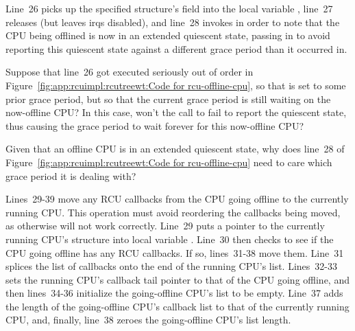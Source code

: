 Line~26 picks up the specified  structure's
 field into the local variable ,
line~27 releases  (but leaves irqs disabled),
and line~28 invokes  in order to note that the
CPU being offlined is now in an extended quiescent state, passing
in  to avoid reporting this quiescent state against
a different grace period than it occurred in.

\QuickQuiz{}
	Suppose that line~26 got executed seriously out of order in
	Figure~\ref{fig:app:rcuimpl:rcutreewt:Code for rcu-offline-cpu},
	so that  is set to some prior grace period, but
	so that the current grace period is still waiting on the
	now-offline CPU?
	In this case, won't the call to  fail to
	report the quiescent state, thus causing the grace period
	to wait forever for this now-offline CPU?
 \QuickQuizEnd

\QuickQuiz{}
	Given that an offline CPU is in an extended quiescent state,
	why does line~28 of
	Figure~\ref{fig:app:rcuimpl:rcutreewt:Code for rcu-offline-cpu}
	need to care which grace period it is
	dealing with?
 \QuickQuizEnd

Lines~29-39 move any RCU callbacks from the CPU going offline to the
currently running CPU.
This operation must avoid reordering the callbacks being moved, as
otherwise  will not work correctly.
Line~29 puts a pointer to the currently running CPU's 
structure into local variable .
Line~30 then checks to see if the CPU going offline has any RCU callbacks.
If so, lines~31-38 move them.
Line~31 splices the list of callbacks onto the end of the running CPU's
list.
Lines~32-33 sets the running CPU's callback tail pointer to that of
the CPU going offline, and then lines~34-36 initialize the going-offline
CPU's list to be empty.
Line~37 adds the length of the going-offline CPU's callback list to
that of the currently running CPU, and, finally, line~38 zeroes the
going-offline CPU's list length.

